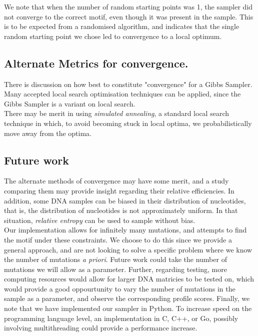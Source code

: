 \documentclass{bioinfo}
\begin{document}
We note that when the number of random starting points was 1, the sampler did not converge to the correct motif, even though it was present in the sample. This is to be expected from a randomised algorithm, and indicates that the single random starting point we chose led to convergence to a local optimum.
\subsection{Alternate Metrics for convergence.}
There is discussion on how best to constitute "convergence" for a Gibbs Sampler.
Many accepted local search optimisation techniques can be applied, since the Gibbs Sampler is a variant on local search.\\
There may be merit in using \textit{simulated annealing}, a standard local search technique in which, to avoid becoming stuck in local optima, we probabilistically move away from the optima. \citep{Finkel}

\subsection{Future work}
The alternate methods of convergence may have some merit, and a study comparing them may provide insight regarding their relative efficiencies. In addition, some DNA samples can be biased in their distribution of nucleotides, that is, the distribution of nucleotides is not approximately uniform. In that situation, \textit{relative entropy} can be used to sample without bias. \\
Our implementation allows for infinitely many mutations, and attempts to find the motif under these constraints. We choose to do this since we provide a general approach, and are not looking to solve a specific problem where we know the number of mutations \textit{a priori}. Future work could take the number of mutations we will allow as a parameter. Further, regarding testing, more computing resources would allow for larger DNA matricies to be tested on, which would provide a good oppourtunity to vary the number of mutations in the sample as a parameter, and observe the corresponding profile scores. Finally, we note that we have implemented our sampler in Python. To increase speed on the programming language level, an implementation in C, C++, or Go, possibly involving multithreading could provide a performance increase.


%
%
%
%

%
%
%
%
\end{document}
